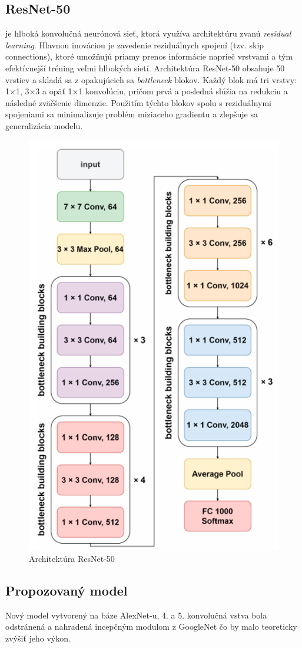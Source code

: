 \documentclass[journal,onecolumn]{IEEEtran}
\begin{document}
\newpage
\subsection{ResNet-50}
\IEEEPARstart{}{}je hlboká konvolučná neurónová sieť, ktorá využíva architektúru zvanú \textit{residual learning}. Hlavnou inováciou je zavedenie reziduálnych spojení (tzv. skip connections), ktoré umožňujú priamy prenos informácie naprieč vrstvami a tým efektívnejší tréning veľmi hlbokých sietí.
Architektúra ResNet-50 obsahuje 50 vrstiev a skladá sa z opakujúcich sa \textit{bottleneck} blokov. Každý blok má tri vrstvy: 1×1, 3×3 a opäť 1×1 konvolúciu, pričom prvá a posledná slúžia na redukciu a následné zväčšenie dimenzie. Použitím týchto blokov spolu s reziduálnymi spojeniami sa minimalizuje problém miziaceho gradientu a zlepšuje sa generalizácia modelu.

\begin{figure}[!htb]
    \centering
    \includegraphics[width=0.45\linewidth]{Images/arch_resnet50.png}
    \caption{Architektúra ResNet-50 \cite{pc}}
    \label{fig:enter-label}
\end{figure}

\newpage
\subsection{Propozovaný model}
\IEEEPARstart{}{} Nový model vytvorený na báze AlexNet-u, 4. a 5. konvolučná vstva bola odstránená a nahradená incepčným modulom z GoogleNet čo by malo teoreticky zvýšiť jeho výkon. 
\end{document}
